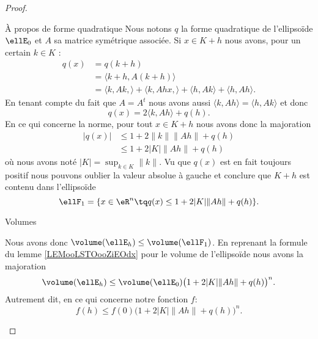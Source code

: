 \begin{proof}
	\begin{subproof}
		\item[À propos de forme quadratique]
		Nous notons \( q\) la forme quadratique de l'ellipsoïde \( \ellE_0\) et \( A\) sa matrice symétrique associée. Si \( x\in K+h\) nous avons, pour un certain \( k\in K\) :
		\begin{subequations}
			\begin{align}
				q(x) & =q(k+h)                                                                                     \\
				     & =\langle k+h, A(k+h)\rangle                                                                 \\
				     & =\langle k,Ak, \rangle +\langle k,Ahx, \rangle +\langle h, Ak\rangle +\langle h, Ah\rangle.
			\end{align}
		\end{subequations}
		En tenant compte du fait que \( A=A^t\) nous avons aussi \( \langle k, Ah\rangle =\langle h, Ak\rangle \) et donc
		\begin{equation}
			q(x)=2\langle k, Ah\rangle +q(h).
		\end{equation}
		En ce qui concerne la norme, pour tout \( x\in K+h\) nous avons donc la majoration
		\begin{subequations}
			\begin{align}
				| q(x) | & \leq 1+2\| k \|\| Ah \|+q(h) \\
				         & \leq 1+2| K |\| Ah \|+q(h)
			\end{align}
		\end{subequations}
		où nous avons noté \( | K |=\sup_{k\in K}\| k \|\). Vu que \( q(x)\) est en fait toujours positif nous pouvons oublier la valeur absolue à gauche et conclure que \( K+h\) est contenu dans l'ellipsoïde
		\begin{equation}
			\ellF_1=\{ x\in \eR^n\tq q(x)\leq 1+2| K |\| Ah \|+q(h) \}.
		\end{equation}

		\item[Volumes]

		Nous avons donc \( \volume(\ellE_h)\leq \volume(\ellF_1)\). En reprenant la formule du lemme \ref{LEMooLSTOooZiEOdx} pour le volume de l'ellipsoïde nous avons la majoration
		\begin{equation}
			\volume(\ellE_h)\leq \volume(\ellE_0)\big( 1+2| K |\| Ah \|+q(h) \big)^n.
		\end{equation}
		Autrement dit, en ce qui concerne notre fonction \( f\):
		\begin{equation}        \label{EQooLVZCooJVxVNx}
			f(h)\leq f(0)\big( 1+2| K |\| Ah \|+q(h) \big)^n.
		\end{equation}


\end{subproof}
\end{proof}
